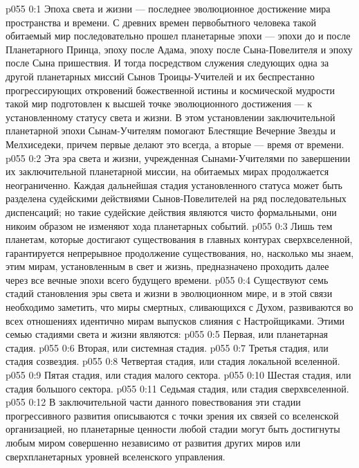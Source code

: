 \author{Могучий Вестник}
\vs p055 0:1 Эпоха света и жизни --- последнее эволюционное достижение мира пространства и времени. С древних времен первобытного человека такой обитаемый мир последовательно прошел планетарные эпохи --- эпохи до и после Планетарного Принца, эпоху после Адама, эпоху после Сына\hyp{}Повелителя и эпоху после Сына пришествия. И тогда посредством служения следующих одна за другой планетарных миссий Сынов Троицы\hyp{}Учителей и их беспрестанно прогрессирующих откровений божественной истины и космической мудрости такой мир подготовлен к высшей точке эволюционного достижения --- к установленному статусу света и жизни. В этом установлении заключительной планетарной эпохи Сынам\hyp{}Учителям помогают Блестящие Вечерние Звезды и Мелхиседеки, причем первые делают это всегда, а вторые --- время от времени.
\vs p055 0:2 Эта эра света и жизни, учрежденная Сынами\hyp{}Учителями по завершении их заключительной планетарной миссии, на обитаемых мирах продолжается неограниченно. Каждая дальнейшая стадия установленного статуса может быть разделена судейскими действиями Сынов\hyp{}Повелителей на ряд последовательных диспенсаций; но такие судейские действия являются чисто формальными, они никоим образом не изменяют хода планетарных событий.
\vs p055 0:3 \pc Лишь тем планетам, которые достигают существования в главных контурах сверхвселенной, гарантируется непрерывное продолжение существования, но, насколько мы знаем, этим мирам, установленным в свет и жизнь, предназначено проходить далее через все вечные эпохи всего будущего времени.
\vs p055 0:4 \pc Существуют семь стадий становления эры света и жизни в эволюционном мире, и в этой связи необходимо заметить, что миры смертных, сливающихся с Духом, развиваются во всех отношениях идентично мирам выпусков слияния с Настройщиками. Этими семью стадиями света и жизни являются:
\vs p055 0:5 \bibnobreakspace Первая, или планетарная стадия.
\vs p055 0:6 \bibnobreakspace Вторая, или системная стадия.
\vs p055 0:7 \bibnobreakspace Третья стадия, или стадия созвездия.
\vs p055 0:8 \bibnobreakspace Четвертая стадия, или стадия локальной вселенной.
\vs p055 0:9 \bibnobreakspace Пятая стадия, или стадия малого сектора.
\vs p055 0:10 \bibnobreakspace Шестая стадия, или стадия большого сектора.
\vs p055 0:11 \bibnobreakspace Седьмая стадия, или стадия сверхвселенной.
\vs p055 0:12 \pc В заключительной части данного повествования эти стадии прогрессивного развития описываются с точки зрения их связей со вселенской организацией, но планетарные ценности любой стадии могут быть достигнуты любым миром совершенно независимо от развития других миров или сверхпланетарных уровней вселенского управления.
